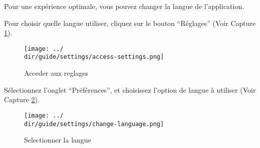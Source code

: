 Pour une expérience optimale, vous pouvez changer la langue de l’application.

Pour choisir quelle langue utiliser, cliquez sur le bouton “Réglages” (Voir Capture \ref{fig:access-settings}).

\begin{figure}[H]
	\texttt{[image: ../\\dir/guide/settings/access-settings.png]}
	\caption{Acceder aux reglages}
	\label{fig:access-settings}
\end{figure}

Sélectionnez l’onglet “Préférences”, et choisissez l’option de langue à utiliser (Voir Capture \ref{fig:change-language}).

\begin{figure}[H]
	\texttt{[image: ../\\dir/guide/settings/change-language.png]}
	\caption{Selectionner la langue}
	\label{fig:change-language}
\end{figure}
